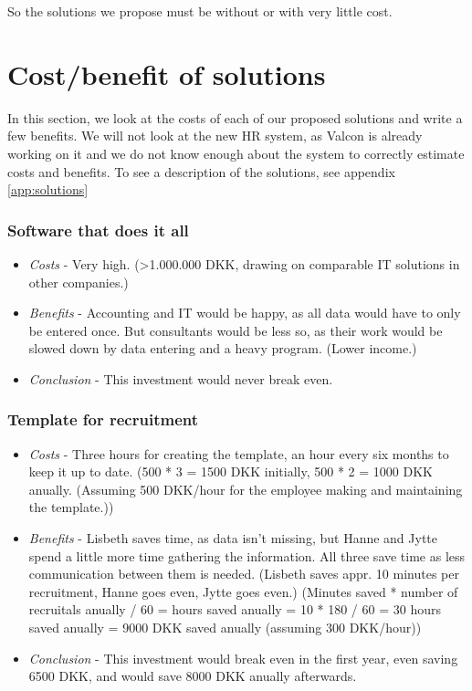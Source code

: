 So the solutions we propose must be without or with very little cost.

\section{Cost/benefit of solutions}
In this section, we look at the costs of each of our proposed solutions and write a few benefits.
We will not look at the new HR system, as Valcon is already working on it and we do not know enough about the system to correctly estimate costs and benefits. 
To see a description of the solutions, see appendix \ref{app:solutions}

\subsubsection{Software that does it all}
\begin{itemize}
\item \emph{Costs} - Very high. (\textgreater 1.000.000 DKK, drawing on comparable IT solutions in other companies.)
\item \emph{Benefits} - Accounting and IT would be happy, as all data would have to only be entered once. But consultants would be less so, as their work would be slowed down by data entering and a heavy program. (Lower income.)
\item \emph{Conclusion} - This investment would never break even.
\end{itemize}

\subsubsection{Template for recruitment}
\begin{itemize}
\item \emph{Costs} - Three hours for creating the template, an hour every six months to keep it up to date. (500 * 3 = 1500 DKK initially, 500 * 2 = 1000 DKK anually. (Assuming 500 DKK/hour for the employee making and maintaining the template.))
\item \emph{Benefits} - Lisbeth saves time, as data isn't missing, but Hanne and Jytte spend a little more time gathering the information. All three save time as less communication between them is needed. (Lisbeth saves appr. 10 minutes per recruitment, Hanne goes even, Jytte goes even.) (Minutes saved * number of recruitals anually / 60 = hours saved anually = 10 * 180 / 60 = 30 hours saved anually = 9000 DKK saved anually (assuming 300 DKK/hour))
\item \emph{Conclusion} - This investment would break even in the first year, even saving 6500 DKK, and would save 8000 DKK anually afterwards.
\end{itemize}

